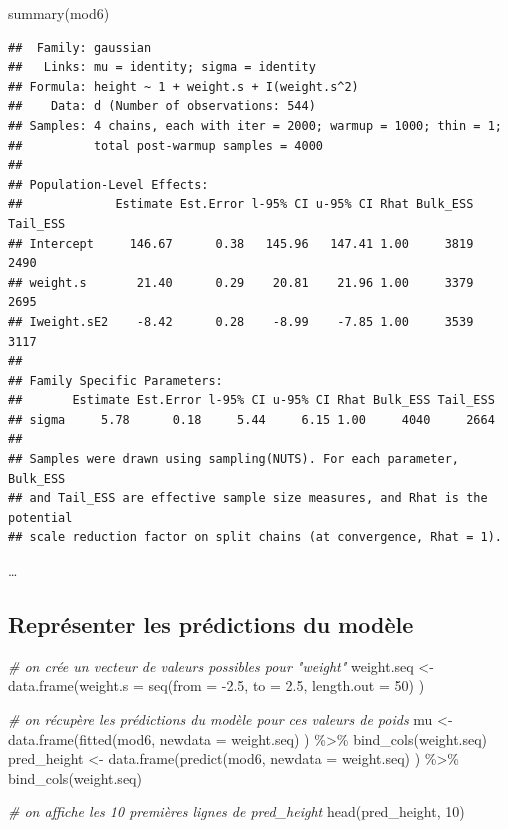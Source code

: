 \documentclass[
  a4paper,11pt,twoside,onecolumn,openright,final,oldfontcommands]{memoir}
\newenvironment{Shaded}{\begin{snugshade}}{\end{snugshade}}
\newcommand{\AttributeTok}[1]{\textcolor[rgb]{0.77,0.63,0.00}{#1}}
\newcommand{\CommentTok}[1]{\textcolor[rgb]{0.56,0.35,0.01}{\textit{#1}}}
\newcommand{\DecValTok}[1]{\textcolor[rgb]{0.00,0.00,0.81}{#1}}
\newcommand{\FloatTok}[1]{\textcolor[rgb]{0.00,0.00,0.81}{#1}}
\newcommand{\FunctionTok}[1]{\textcolor[rgb]{0.00,0.00,0.00}{#1}}
\newcommand{\NormalTok}[1]{#1}
\newcommand{\OtherTok}[1]{\textcolor[rgb]{0.56,0.35,0.01}{#1}}
\newcommand{\SpecialCharTok}[1]{\textcolor[rgb]{0.00,0.00,0.00}{#1}}
\theoremstyle{definition}
\theoremstyle{definition}
\theoremstyle{definition}
\theoremstyle{remark}
\begin{document}
\begin{Shaded}
\begin{Highlighting}[]
\FunctionTok{summary}\NormalTok{(mod6)}
\end{Highlighting}
\end{Shaded}

\begin{verbatim}
##  Family: gaussian 
##   Links: mu = identity; sigma = identity 
## Formula: height ~ 1 + weight.s + I(weight.s^2) 
##    Data: d (Number of observations: 544) 
## Samples: 4 chains, each with iter = 2000; warmup = 1000; thin = 1;
##          total post-warmup samples = 4000
## 
## Population-Level Effects: 
##             Estimate Est.Error l-95% CI u-95% CI Rhat Bulk_ESS Tail_ESS
## Intercept     146.67      0.38   145.96   147.41 1.00     3819     2490
## weight.s       21.40      0.29    20.81    21.96 1.00     3379     2695
## Iweight.sE2    -8.42      0.28    -8.99    -7.85 1.00     3539     3117
## 
## Family Specific Parameters: 
##       Estimate Est.Error l-95% CI u-95% CI Rhat Bulk_ESS Tail_ESS
## sigma     5.78      0.18     5.44     6.15 1.00     4040     2664
## 
## Samples were drawn using sampling(NUTS). For each parameter, Bulk_ESS
## and Tail_ESS are effective sample size measures, and Rhat is the potential
## scale reduction factor on split chains (at convergence, Rhat = 1).
\end{verbatim}

\ldots{}

\hypertarget{repruxe9senter-les-pruxe9dictions-du-moduxe8le-1}{%
\subsection{Représenter les prédictions du modèle}\label{repruxe9senter-les-pruxe9dictions-du-moduxe8le-1}}

\begin{Shaded}
\begin{Highlighting}[]
\CommentTok{\# on crée un vecteur de valeurs possibles pour "weight"}
\NormalTok{weight.seq }\OtherTok{\textless{}{-}} \FunctionTok{data.frame}\NormalTok{(}\AttributeTok{weight.s =} \FunctionTok{seq}\NormalTok{(}\AttributeTok{from =} \SpecialCharTok{{-}}\FloatTok{2.5}\NormalTok{, }\AttributeTok{to =} \FloatTok{2.5}\NormalTok{, }\AttributeTok{length.out =} \DecValTok{50}\NormalTok{) )}

\CommentTok{\# on récupère les prédictions du modèle pour ces valeurs de poids}
\NormalTok{mu }\OtherTok{\textless{}{-}} \FunctionTok{data.frame}\NormalTok{(}\FunctionTok{fitted}\NormalTok{(mod6, }\AttributeTok{newdata =}\NormalTok{ weight.seq) ) }\SpecialCharTok{\%\textgreater{}\%} \FunctionTok{bind\_cols}\NormalTok{(weight.seq)}
\NormalTok{pred\_height }\OtherTok{\textless{}{-}} \FunctionTok{data.frame}\NormalTok{(}\FunctionTok{predict}\NormalTok{(mod6, }\AttributeTok{newdata =}\NormalTok{ weight.seq) ) }\SpecialCharTok{\%\textgreater{}\%} \FunctionTok{bind\_cols}\NormalTok{(weight.seq)}

\CommentTok{\# on affiche les 10 premières lignes de pred\_height}
\FunctionTok{head}\NormalTok{(pred\_height, }\DecValTok{10}\NormalTok{)}
\end{Highlighting}
\end{Shaded}
\end{document}
